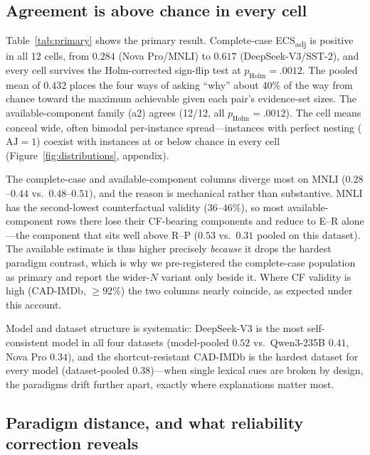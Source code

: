 \documentclass[11pt]{article}
\newcommand{\ecsadj}{\mbox{ECS\textsubscript{adj}}}
\newcommand{\aj}{\mathrm{AJ}}
\newcommand{\holm}[1]{$p_{\mathrm{Holm}}{=}#1$}
\begin{document}
\subsection{Agreement is above chance in every cell}
\label{sec:above-chance}

Table~\ref{tab:primary} shows the primary result. Complete-case \ecsadj{} is positive in all 12 cells, from $0.284$ (Nova Pro/MNLI) to $0.617$ (DeepSeek-V3/SST-2), and every cell survives the Holm-corrected sign-flip test at \holm{.0012}. The pooled mean of $0.432$ places the four ways of asking ``why'' about 40\% of the way from chance toward the maximum achievable given each pair's evidence-set sizes. The available-component family (a2) agrees (12/12, all \holm{.0012}). The cell means conceal wide, often bimodal per-instance spread---instances with perfect nesting ($\aj=1$) coexist with instances at or below chance in every cell (Figure~\ref{fig:distributions}, appendix).

The complete-case and available-component columns diverge most on MNLI ($0.28$--$0.44$ vs.\ $0.48$--$0.51$), and the reason is mechanical rather than substantive. MNLI has the second-lowest counterfactual validity ($36$--$46\%$), so most available-component rows there lose their CF-bearing components and reduce to E--R alone---the component that sits well above R--P ($0.53$ vs.\ $0.31$ pooled on this dataset). The available estimate is thus higher precisely \emph{because} it drops the hardest paradigm contrast, which is why we pre-registered the complete-case population as primary and report the wider-$N$ variant only beside it. Where CF validity is high (CAD-IMDb, $\ge 92\%$) the two columns nearly coincide, as expected under this account.

Model and dataset structure is systematic: DeepSeek-V3 is the most self-consistent model in all four datasets (model-pooled $0.52$ vs.\ Qwen3-235B $0.41$, Nova Pro $0.34$), and the shortcut-resistant CAD-IMDb is the hardest dataset for every model (dataset-pooled $0.38$)---when single lexical cues are broken by design, the paradigms drift further apart, exactly where explanations matter most.

\subsection{Paradigm distance, and what reliability correction reveals}
\label{sec:ladder}
\end{document}
